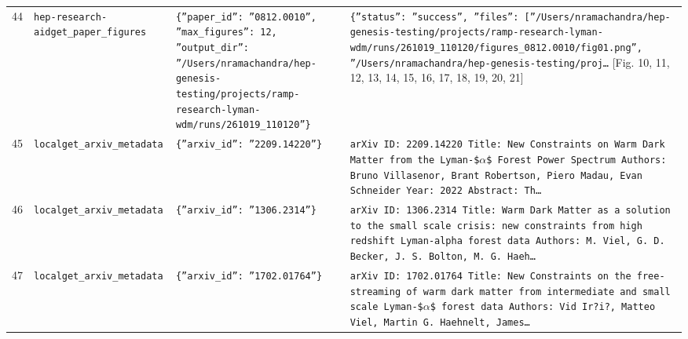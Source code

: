 \documentclass[11pt,a4paper]{article}
\begin{document}
\begin{longtable}{@{}p{}p{}p{}p{}@{}}
44 & \texttt{hep-research-aid}\newline\texttt{get\_\allowbreak{}paper\_\allowbreak{}figures} & \texttt{\{''paper\_\allowbreak{}id'':\allowbreak{} ''0812.0010'',\allowbreak{} ''max\_\allowbreak{}figures'':\allowbreak{} 12,\allowbreak{} ''output\_\allowbreak{}dir'':\allowbreak{} ''/\allowbreak{}Users/\allowbreak{}nramachandra/\allowbreak{}hep-genesis-testing/\allowbreak{}projects/\allowbreak{}ramp-research-lyman-wdm/\allowbreak{}runs/\allowbreak{}261019\_\allowbreak{}110120''\}\allowbreak{}} & \texttt{\{''status'':\allowbreak{} ''success'',\allowbreak{} ''files'':\allowbreak{} [''/\allowbreak{}Users/\allowbreak{}nramachandra/\allowbreak{}hep-genesis-testing/\allowbreak{}projects/\allowbreak{}ramp-research-lyman-wdm/\allowbreak{}runs/\allowbreak{}261019\_\allowbreak{}110120/\allowbreak{}figures\_\allowbreak{}0812.0010/\allowbreak{}fig01.png'',\allowbreak{} ''/\allowbreak{}Users/\allowbreak{}nramachandra/\allowbreak{}hep-genesis-testing/\allowbreak{}proj\ldots{}\allowbreak{}} [Fig. 10, 11, 12, 13, 14, 15, 16, 17, 18, 19, 20, 21] \\
45 & \texttt{local}\newline\texttt{get\_\allowbreak{}arxiv\_\allowbreak{}metadata} & \texttt{\{''arxiv\_\allowbreak{}id'':\allowbreak{} ''2209.14220''\}\allowbreak{}} & \texttt{arXiv ID:\allowbreak{} 2209.14220 Title:\allowbreak{} New Constraints on Warm Dark Matter from the Lyman-\$$\alpha$\$ Forest Power Spectrum Authors:\allowbreak{} Bruno Villasenor,\allowbreak{} Brant Robertson,\allowbreak{} Piero Madau,\allowbreak{} Evan Schneider Year:\allowbreak{} 2022 Abstract:\allowbreak{} Th\ldots{}\allowbreak{}} \\
46 & \texttt{local}\newline\texttt{get\_\allowbreak{}arxiv\_\allowbreak{}metadata} & \texttt{\{''arxiv\_\allowbreak{}id'':\allowbreak{} ''1306.2314''\}\allowbreak{}} & \texttt{arXiv ID:\allowbreak{} 1306.2314 Title:\allowbreak{} Warm Dark Matter as a solution to the small scale crisis:\allowbreak{} new constraints from high redshift Lyman-alpha forest data Authors:\allowbreak{} M. Viel,\allowbreak{} G. D. Becker,\allowbreak{} J. S. Bolton,\allowbreak{} M. G. Haeh\ldots{}\allowbreak{}} \\
47 & \texttt{local}\newline\texttt{get\_\allowbreak{}arxiv\_\allowbreak{}metadata} & \texttt{\{''arxiv\_\allowbreak{}id'':\allowbreak{} ''1702.01764''\}\allowbreak{}} & \texttt{arXiv ID:\allowbreak{} 1702.01764 Title:\allowbreak{} New Constraints on the free-streaming of warm dark matter from intermediate and small scale Lyman-\$$\alpha$\$ forest data Authors:\allowbreak{} Vid Ir?i?,\allowbreak{} Matteo Viel,\allowbreak{} Martin G. Haehnelt,\allowbreak{} James\ldots{}\allowbreak{}} \\

\end{longtable}
\end{document}
